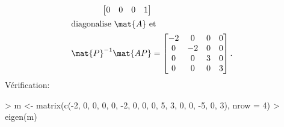\begin{exercice}
\begin{sol}
\begin{enumerate}
\begin{align*}
\begin{bmatrix}
          0 & 0 & 0 &  1 \\
        \end{bmatrix} \\
        \intertext{diagonalise $\mat{A}$ et}
        \mat{P}^{-1} \mat{AP}
        &=
        \begin{bmatrix}
          -2 &  0 & 0 & 0 \\
           0 & -2 & 0 & 0 \\
           0 &  0 & 3 & 0 \\
           0 &  0 & 0 & 3 \\
        \end{bmatrix}.
      \end{align*}
      Vérification:
\begin{Schunk}
\begin{Sinput}
> m <- matrix(c(-2, 0, 0, 0, 0, -2, 0, 0, 0, 5, 3, 0, 0, -5, 0, 3), nrow = 4)
> eigen(m)
\end{Sinput}
\end{Schunk}
\end{enumerate}
\end{sol}
\end{exercice}
